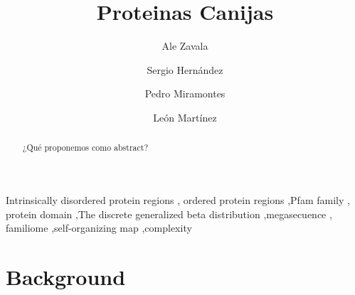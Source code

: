 \documentclass[preprint,12pt]{elsarticle}
\begin{document}
\begin{frontmatter}


\title{Proteinas Canijas}




\author[1]{Ale Zavala}
\author[1]{Sergio Hern\'andez }
\author[1]{Pedro Miramontes}
\author[2]{León Martínez}

\address[1]{Facultad de Ciencias, National Autonomous University of Mexico, Mexico City 04510, Mexico}
\address[2]{Metropolitan Autonomous University}

\begin{abstract}
¿Qué proponemos como abstract?
\end{abstract}

\begin{keyword}
Intrinsically disordered protein regions \sep 
ordered protein regions \sep Pfam family \sep 
protein domain \sep The discrete generalized 
beta distribution \sep megasecuence \sep 
familiome \sep self-organizing map \sep complexity


\end{keyword}

\end{frontmatter}

\linenumbers

\section{Background}
\label{S:1}
\end{document}
